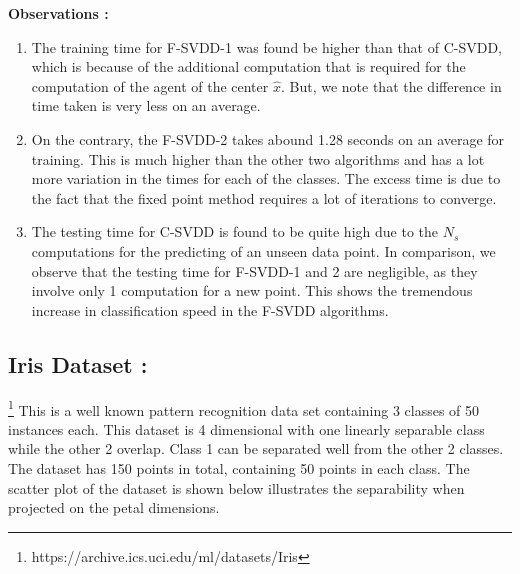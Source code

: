 \documentclass{article} %
\begin{document}
\textbf{Observations :}
\begin{enumerate}
\item The training time for F-SVDD-1 was found be higher than that of C-SVDD, which is because of the additional computation that is required for the computation of the agent of the center $\hat{x}$. But, we note that the difference in time taken is very less on an average.

\item On the contrary, the F-SVDD-2 takes abound 1.28 seconds on an average for training. This is much higher than the other two algorithms and has a lot more variation in the times for each of the classes. The excess time is due to the fact that the fixed point method requires a lot of iterations to converge.

\item The testing time for C-SVDD is found to be quite high due to the $N_s$ computations for the predicting of an unseen data point. In comparison, we observe that the testing time for F-SVDD-1 and 2 are negligible, as they involve only 1 computation for a new point. This shows the tremendous increase in classification speed in the F-SVDD algorithms.
\end{enumerate}

 
\subsection{Iris Dataset :} \footnote{https://archive.ics.uci.edu/ml/datasets/Iris}
This is a well known pattern recognition data set containing 3 classes of 50 instances each. This dataset is 4 dimensional with one linearly separable class while the other 2 overlap. Class 1 can be separated well from the other 2 classes. The dataset has 150 points in total, containing 50 points in each class.
The scatter plot of the dataset is shown below illustrates the separability when projected on the petal dimensions.
\end{document}
